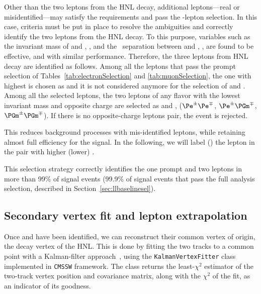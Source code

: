 Other than the two leptons from the HNL decay, additional
leptons---real or misidentified---may satisfy the \absdxy requirements
and pass the \displ-lepton selection. In this case, criteria must
be put in place to resolve the ambiguities and correctly identify the
two leptons from the HNL decay.
To this purpose, variables such as the invariant mass of \ltwo and
\lthree, \mtwol, and the \DR\ separation between \ltwo and \lthree, \DRtwol, are found to be
effective, and with similar performance.
Therefore, the three leptons from HNL decay are identified as follows.
Among all the leptons that pass the prompt selection of
Tables~\ref{tab:electronSelection} and \ref{tab:muonSelection}, the one
with highest \pt is chosen as \lone and it is not considered anymore for the selection of \ltwo and \lthree.
Among all the selected \displ leptons, the two leptons of any
flavor with the lowest invariant mass and opposite charge are selected
as \ltwo and \lthree,
($\Pe^\pm\Pe^\mp$, $\Pe^\pm\PGm^\mp$, $\PGm^\pm\PGm^\mp$).
If there is no opposite-charge \displ leptons pair, the
event is rejected. 

This reduces background processes with
mis-identified leptons, while retaining almost full efficiency for the
signal. In the following, we will label \ltwo (\lthree) the lepton in
the pair with higher (lower) \pt.

This selection strategy correctly identifies the one prompt and two
\displ leptons in more than 99\% of signal events (99.9\% of
signal events that pass the full analysis selection, described in
Section~\ref{sec:llbaselinesel}).
\newpage
\subsection{Secondary vertex fit and lepton extrapolation}

Once \ltwo and \lthree have been identified, we can reconstruct their
common vertex of origin, \ie the decay vertex of the HNL. This is done
by fitting the two tracks to a common point with a Kalman-filter
approach~\cite{kvfTwiki},
using the
\texttt{KalmanVertexFitter} class implemented in \texttt{CMSSW} framework.
The class returns the least-$\chi^2$ estimator of the two-track vertex
position and covariance matrix, along with the $\chi^2$ of the fit, as
an indicator of its goodness.

